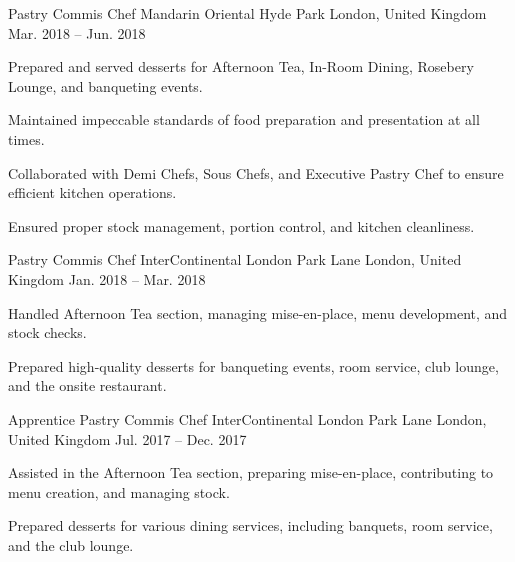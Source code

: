 \begin{cventries}
  \cventry
    {Pastry Commis Chef} %
    {Mandarin Oriental Hyde Park} %
    {London, United Kingdom} %
    {Mar. 2018 -- Jun. 2018} %
    {
      \begin{cvitems} %
        \item {Prepared and served desserts for Afternoon Tea, In-Room Dining, Rosebery Lounge, and banqueting events.}
        \item {Maintained impeccable standards of food preparation and presentation at all times.}
        \item {Collaborated with Demi Chefs, Sous Chefs, and Executive Pastry Chef to ensure efficient kitchen operations.}
        \item {Ensured proper stock management, portion control, and kitchen cleanliness.}
      \end{cvitems}
    }

  \cventry
    {Pastry Commis Chef} %
    {InterContinental London Park Lane} %
    {London, United Kingdom} %
    {Jan. 2018 -- Mar. 2018} %
    {
      \begin{cvitems} %
        \item {Handled Afternoon Tea section, managing mise-en-place, menu development, and stock checks.}
        \item {Prepared high-quality desserts for banqueting events, room service, club lounge, and the onsite restaurant.}
      \end{cvitems}
    }

  \cventry
    {Apprentice Pastry Commis Chef} %
    {InterContinental London Park Lane} %
    {London, United Kingdom} %
    {Jul. 2017 -- Dec. 2017} %
    {
      \begin{cvitems} %
        \item {Assisted in the Afternoon Tea section, preparing mise-en-place, contributing to menu creation, and managing stock.}
        \item {Prepared desserts for various dining services, including banquets, room service, and the club lounge.}
      \end{cvitems}
    }


\end{cventries}
